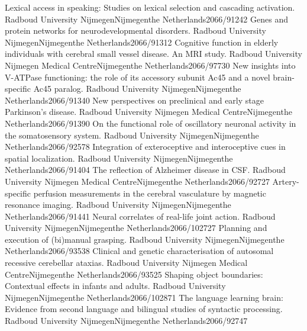 	{Lexical access in speaking: Studies on lexical selection and cascading activation.}
	{Radboud University Nijmegen}{Nijmegen}{the Netherlands}{2066/91242}
	{Genes and protein networks for neurodevelopmental disorders.}
	{Radboud University Nijmegen}{Nijmegen}{the Netherlands}{2066/91312}
	{Cognitive function in elderly individuals with cerebral small vessel disease. An MRI study.}
	{Radboud University Nijmegen Medical Centre}{Nijmegen}{the Netherlands}{2066/97730}
	{New insights into V-ATPase functioning: the role of its accessory subunit Ac45 and a novel brain-specific Ac45 paralog.}
	{Radboud University Nijmegen}{Nijmegen}{the Netherlands}{2066/91340}
	{New perspectives on preclinical and early stage Parkinson's disease.}
	{Radboud University Nijmegen Medical Centre}{Nijmegen}{the Netherlands}{2066/91390}
	{On the functional role of oscillatory neuronal activity in the somatosensory system.}
	{Radboud University Nijmegen}{Nijmegen}{the Netherlands}{2066/92578}
	{Integration of exteroceptive and interoceptive cues in spatial localization.}
	{Radboud University Nijmegen}{Nijmegen}{the Netherlands}{2066/91404}
	{The reflection of Alzheimer disease in CSF.}
	{Radboud University Nijmegen Medical Centre}{Nijmegen}{the Netherlands}{2066/92727}
	{Artery-specific perfusion measurements in the cerebral vasculature by magnetic resonance imaging.}
	{Radboud University Nijmegen}{Nijmegen}{the Netherlands}{2066/91441}
	{Neural correlates of real-life joint action.}
	{Radboud University Nijmegen}{Nijmegen}{the Netherlands}{2066/102727}
	{Planning and execution of (bi)manual grasping.}
	{Radboud University Nijmegen}{Nijmegen}{the Netherlands}{2066/93538}
	{Clinical and genetic characterisation of autosomal recessive cerebellar ataxias.}
	{Radboud University Nijmegen Medical Centre}{Nijmegen}{the Netherlands}{2066/93525}
	{Shaping object boundaries: Contextual effects in infants and adults.}
	{Radboud University Nijmegen}{Nijmegen}{the Netherlands}{2066/102871}
	{The language learning brain: Evidence from second language and bilingual studies of syntactic processing.}
	{Radboud University Nijmegen}{Nijmegen}{the Netherlands}{2066/92747}
